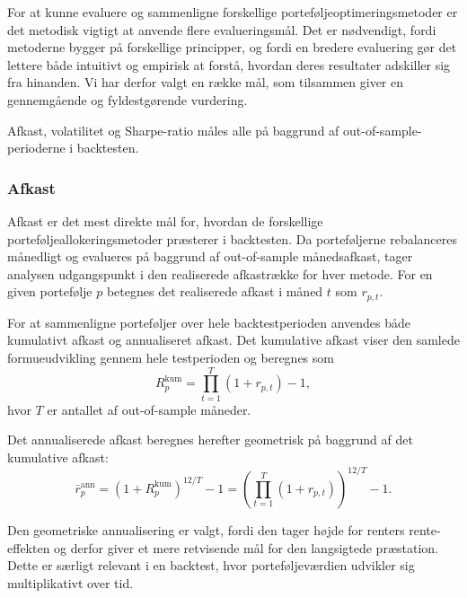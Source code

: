\documentclass[../main.tex]{subfiles}
\begin{document}
For at kunne evaluere og sammenligne forskellige porteføljeoptimeringsmetoder er det metodisk vigtigt at anvende flere evalueringsmål. Det er nødvendigt, fordi metoderne bygger på forskellige principper, og fordi en bredere evaluering gør det lettere både intuitivt og empirisk at forstå, hvordan deres resultater adskiller sig fra hinanden. Vi har derfor valgt en række mål, som tilsammen giver en gennemgående og fyldestgørende vurdering.

Afkast, volatilitet og Sharpe-ratio måles alle på baggrund af out-of-sample-perioderne i backtesten.

\subsubsection{Afkast}

Afkast er det mest direkte mål for, hvordan de forskellige porteføljeallokeringsmetoder præsterer i backtesten. Da porteføljerne rebalanceres månedligt og evalueres på baggrund af out-of-sample månedsafkast, tager analysen udgangspunkt i den realiserede afkastrække for hver metode. For en given portefølje $p$ betegnes det realiserede afkast i måned $t$ som $r_{p,t}$.

For at sammenligne porteføljer over hele backtestperioden anvendes både kumulativt afkast og annualiseret afkast. Det kumulative afkast viser den samlede formueudvikling gennem hele testperioden og beregnes som
\begin{equation}
R_{p}^{\mathrm{kum}}
=
\prod_{t=1}^{T}(1+r_{p,t}) - 1,
\label{eq:cumulative_return}
\end{equation}
hvor $T$ er antallet af out-of-sample måneder.

Det annualiserede afkast beregnes herefter geometrisk på baggrund af det kumulative afkast:
\begin{equation}
\bar{r}_{p}^{\mathrm{ann}}
=
\left(1 + R_{p}^{\mathrm{kum}}\right)^{12/T} - 1
=
\left(
\prod_{t=1}^{T}(1+r_{p,t})
\right)^{12/T} - 1.
\label{eq:annualized_return}
\end{equation}

Den geometriske annualisering er valgt, fordi den tager højde for renters rente-effekten og derfor giver et mere retvisende mål for den langsigtede præstation. Dette er særligt relevant i en backtest, hvor porteføljeværdien udvikler sig multiplikativt over tid.
\end{document}
